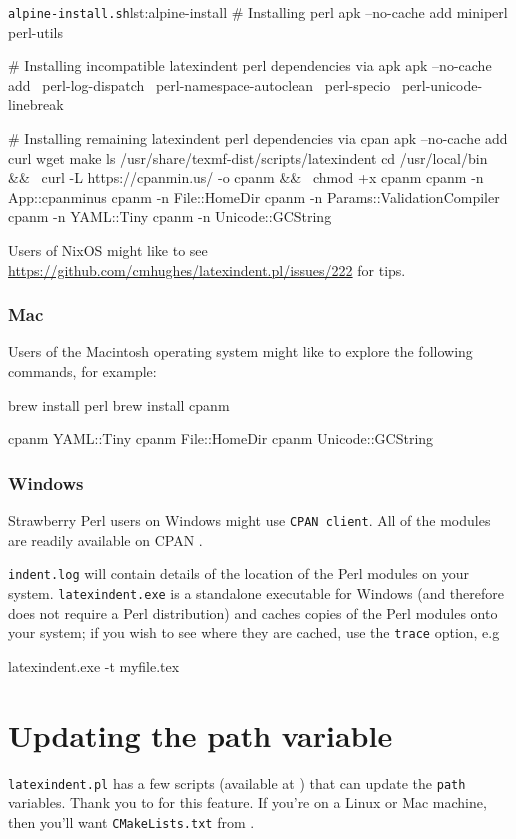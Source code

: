 			\begin{cmhlistings}[style=tcblatex,language=Bash]{\texttt{alpine-install.sh}}{lst:alpine-install}
# Installing perl
apk --no-cache add miniperl perl-utils

# Installing incompatible latexindent perl dependencies via apk
apk --no-cache add \
    perl-log-dispatch \
    perl-namespace-autoclean \
    perl-specio \
    perl-unicode-linebreak

# Installing remaining latexindent perl dependencies via cpan
apk --no-cache add curl wget make
ls /usr/share/texmf-dist/scripts/latexindent
cd /usr/local/bin && \
    curl -L https://cpanmin.us/ -o cpanm && \
    chmod +x cpanm
cpanm -n App::cpanminus
cpanm -n File::HomeDir
cpanm -n Params::ValidationCompiler
cpanm -n YAML::Tiny
cpanm -n Unicode::GCString
\end{cmhlistings}

			Users of NixOS might like to see
			\href{https://github.com/cmhughes/latexindent.pl/issues/222}{https://github.com/cmhughes/latexindent.pl/issues/222}
			for tips.
	\subsubsection{Mac}
		Users of the Macintosh operating system might like to explore the following commands, for
		example:
		\begin{commandshell}
brew install perl
brew install cpanm

cpanm YAML::Tiny
cpanm File::HomeDir
cpanm Unicode::GCString
\end{commandshell}

	\subsubsection{Windows}
		Strawberry Perl users on Windows might use \texttt{CPAN client}. All of the modules are
		readily available on CPAN \cite{cpan}.

		\texttt{indent.log} will contain details of the location
		of the Perl modules on your system. \texttt{latexindent.exe} is a standalone executable
		for Windows (and therefore does not require a Perl distribution) and caches copies of the
		Perl modules onto your system; if you wish to see where they are cached, use the
		\texttt{trace} option, e.g
		\begin{dosprompt}
latexindent.exe -t myfile.tex
 \end{dosprompt}

	\section{Updating the path variable}\label{sec:updating-path}
	 \texttt{latexindent.pl} has a few scripts (available at \cite{latexindent-home}) that can
	 update the \texttt{path} variables. Thank you to \cite{jasjuang} for this feature. If
	 you're on a Linux or Mac machine, then you'll want \texttt{CMakeLists.txt} from
	 \cite{latexindent-home}.
